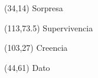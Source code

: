 \documentclass[aspectratio=169,10pt,xcolor=svgnames,compress]{beamer}
\begin{document}
\begin{frame}[plain]
  \begin{textblock}{80}(34,14)
 \Large \textcolor{black!50}{Sorpresa}
\end{textblock}

\begin{textblock}{47}(113,73.5)
\centering \Large \textcolor{black!5}{Supervivencia}
\end{textblock}

\begin{textblock}{80}(103,27)
\Large \textcolor{black!10}{Creencia}
\end{textblock}

\begin{textblock}{80}(44,61)
\Large  \textcolor{black!15}{Dato}
\end{textblock}


{}
\end{frame}
\end{document}
